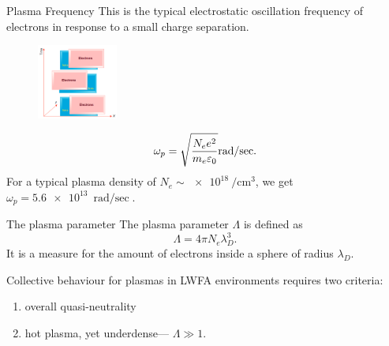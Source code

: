 \documentclass[]{beamer}
\begin{document}
\newcommand{\plasmafreq}{Plasma Frequency}
\begin{frame}{\plasmafreq}
This is the typical electrostatic oscillation frequency of electrons in response to a small charge separation.
\begin{figure}
  \includegraphics[width=100px]{figures/plasma_oscillation.PNG}
\end{figure}
\begin{equation*}
		\omega_p=\sqrt{\frac{N_e e^2}{m_e \varepsilon_0}}\si[per-mode=fraction]{\radian\per\sec}.\label{eq:plasma-frequency}
\end{equation*}
For a typical plasma density of $N_e \sim \SI{e18}{\per\cubic\cm}$, we get $\omega_p=\SI{5.6e13}{\radian\per\sec}$.%
\end{frame}
\begin{frame}{The plasma parameter}
The plasma parameter $\Lambda$ is defined as
\begin{equation*}
  \Lambda=4\pi N_e \lambda_D ^3.
\end{equation*}
It is a measure for the amount of electrons inside a sphere of radius $\lambda_D$.

Collective behaviour for plasmas in LWFA environments requires two criteria:
\begin{enumerate}
  \item overall quasi-neutrality
  \item hot plasma, yet underdense\footnotemark --- $\Lambda \gg 1$.
\end{enumerate}
\end{frame}
\end{document}
